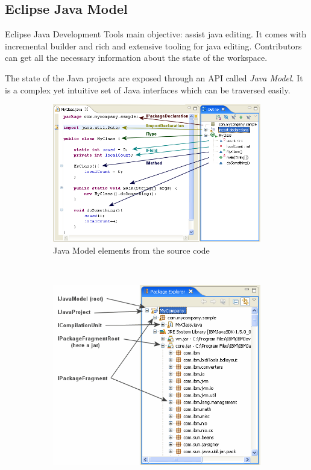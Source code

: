\subsection{Eclipse Java Model}
Eclipse Java Development Tools main objective: assist java editing. It comes
with incremental builder and rich and extensive tooling for java editing.
Contributors can get all the necessary information about the state of the
workspace.

The state of the Java projects are exposed through an API called \emph{Java
Model}.
It is a complex yet intuitive set of Java interfaces which can be traversed
easily.
\begin{figure}
        \centering
        \begin{subfigure}[b]{0.5\textwidth}
                \centering
                \includegraphics[width=\textwidth]{figures/javamodel2.png}
                \caption{Java Model elements from the source code}
                \label{fig:javamodel2.png}
        \end{subfigure}~
        \begin{subfigure}[b]{0.5\textwidth}
                \centering
                \includegraphics[width=\textwidth]{figures/javamodel1.png}

\end{subfigure}
\end{figure}
